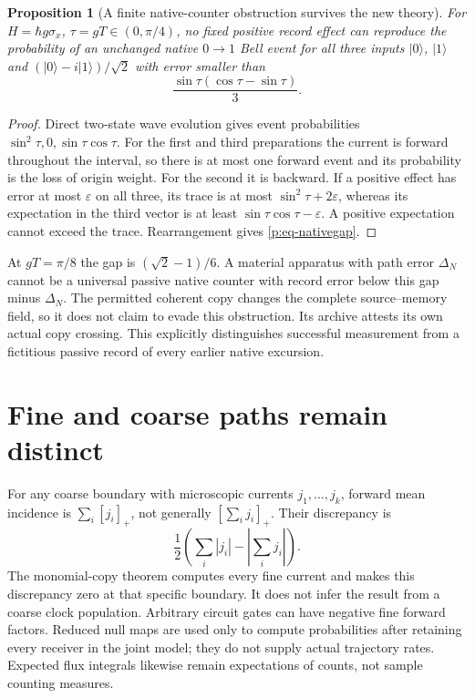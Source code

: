 \documentclass[11pt,oneside,openany]{book}
\newtheorem{proposition}[theorem]{Proposition}
\theoremstyle{definition}
\theoremstyle{remark}\newtheorem{remark}[theorem]{Remark}
\begin{document}
\begin{proposition}[A finite native-counter obstruction survives the new theory]
For $H=\hbar g\sigma_x$, $\tau=gT\in(0,\pi/4)$, no fixed positive record effect can reproduce the probability of an unchanged native $0\to1$ Bell event for all three inputs $|0\rangle$, $|1\rangle$ and $(|0\rangle-i|1\rangle)/\sqrt2$ with error smaller than
\begin{equation}
 \frac{\sin\tau(\cos\tau-\sin\tau)}{3}.
 \label{p:eq-nativegap}
\end{equation}
\end{proposition}
\begin{proof}
Direct two-state wave evolution gives event probabilities $\sin^2\tau,0,\sin\tau\cos\tau$. For the first and third preparations the current is forward throughout the interval, so there is at most one forward event and its probability is the loss of origin weight. For the second it is backward. If a positive effect has error at most $\varepsilon$ on all three, its trace is at most $\sin^2\tau+2\varepsilon$, whereas its expectation in the third vector is at least $\sin\tau\cos\tau-\varepsilon$. A positive expectation cannot exceed the trace. Rearrangement gives \eqref{p:eq-nativegap}.
\end{proof}
At $gT=\pi/8$ the gap is $(\sqrt2-1)/6$. A material apparatus with path error $\Delta_N$ cannot be a universal passive native counter with record error below this gap minus $\Delta_N$. The permitted coherent copy changes the complete source--memory field, so it does not claim to evade this obstruction. Its archive attests its own actual copy crossing. This explicitly distinguishes successful measurement from a fictitious passive record of every earlier native excursion.

\section{Fine and coarse paths remain distinct}
For any coarse boundary with microscopic currents $j_1,\ldots,j_k$, forward mean incidence is $\sum_i[j_i]_+$, not generally $[\sum_i j_i]_+$. Their discrepancy is
\[
 \frac12\left(\sum_i|j_i|-\left|\sum_i j_i\right|\right).
\]
The monomial-copy theorem computes every fine current and makes this discrepancy zero at that specific boundary. It does not infer the result from a coarse clock population. Arbitrary circuit gates can have negative fine forward factors. Reduced null maps are used only to compute probabilities after retaining every receiver in the joint model; they do not supply actual trajectory rates. Expected flux integrals likewise remain expectations of counts, not sample counting measures.
\end{document}
